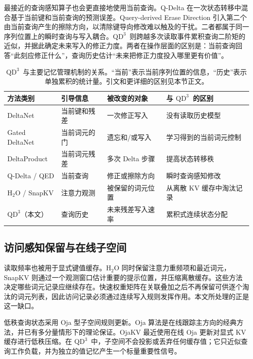 \documentclass[11pt,a4paper]{ctexart}
\newcommand{\QDDD}{\ensuremath{\mathrm{QD}^{3}}}
\begin{document}
最接近的查询感知算子也会更直接地使用当前查询。Q-Delta 在一次状态转移中混合基于当前键和当前查询的预测误差\cite{park2026qdelta}。Query-derived Erase Direction 引入第二个由当前查询产生的擦除方向，以清除键导向修改难以触及的干扰\cite{gupta2026qed}。二者都属于同一序列位置上的瞬时查询与写入耦合。\QDDD\ 则跨越多次读取事件累积查询二阶矩的近似，并据此确定未来写入的修正力度。两者在操作层面的区别是：当前查询回答“此刻应修正什么”，查询历史估计“未来把修正力度投入哪里更有价值”。

\begin{table}[t]
\caption{\QDDD\ 与主要记忆管理机制的关系。“当前”表示当前序列位置的信息，“历史”表示单独累积的统计量。引文和更详细的区别见本节正文。}
\label{tab:related-zh}
\centering
\small
\setlength{\tabcolsep}{3pt}
\begin{tabular}{@{}p{}p{}p{}p{}@{}}
\toprule
方法类别 & 引导信息 & 被改变的对象 & 与 \QDDD\ 的区别 \\
\midrule
DeltaNet & 当前键和残差 & 一次修正写入 & 没有读取历史模型 \\
Gated DeltaNet & 当前词元的门 & 遗忘和/或写入 & 学习得到的当前词元控制 \\
DeltaProduct & 当前词元残差 & 多次 Delta 步骤 & 提高状态转移秩 \\
Q-Delta / QED & 当前查询 & 修正或擦除方向 & 瞬时查询感知修改 \\
H$_2$O / SnapKV & 注意力观测 & 被保留的词元位置 & 从离散 KV 缓存中淘汰记录 \\
\QDDD（本文） & 查询历史 & 未来残差写入速率 & 累积式连续状态分配 \\
\bottomrule
\end{tabular}
\end{table}

\subsection{访问感知保留与在线子空间}

读取频率也被用于显式键值缓存。H$_2$O 同时保留注意力重频项和最近词元\cite{zhang2023h2o}，SnapKV 则通过一个观测窗口估计重要的提示位置，并压缩离散缓存\cite{li2024snapkv}。这些方法决定哪些词元记录应继续存在。快速权重矩阵在关联叠加之后不再保留可供逐个淘汰的词元列表，因此访问记录必须通过连续写入规则发挥作用。本文所处理的正是这一缺口。

低秩查询状态采用 Oja 型子空间规则更新\cite{oja1982}。Oja 算法是在线跟踪主方向的经典方法，并已有多分量情形下的理论保证\cite{huang2021oja}。OjaKV 最近使用在线 Oja 更新对显式 KV 缓存进行低秩压缩\cite{zhu2025ojakv}。在 \QDDD\ 中，子空间不会投影或丢弃任何缓存值；它只近似查询工作负载，并为独立的值记忆产生一个标量重要性信号。
\end{document}
